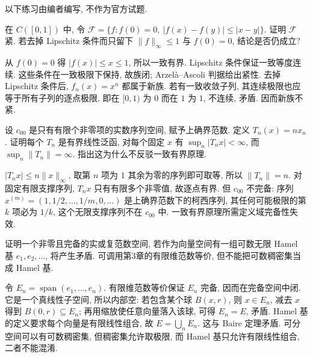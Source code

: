以下练习由编者编写, 不作为官方试题.
\begin{exercise}
在 $C([0,1])$ 中, 令 $\mathcal F=\{f:f(0)=0,\ |f(x)-f(y)|\le|x-y|\}$. 证明 $\mathcal F$ 紧. 若去掉 Lipschitz 条件而只留下 $\lVert f\rVert_\infty\le1$ 与 $f(0)=0$, 结论是否仍成立?
\end{exercise}
\begin{solution}
从 $f(0)=0$ 得 $|f(x)|\le x\le1$, 所以一致有界. Lipschitz 条件保证一致等度连续. 这些条件在一致极限下保持, 故族闭; Arzel\`a--Ascoli 判据给出紧性. 去掉 Lipschitz 条件后, $f_n(x)=x^n$ 都属于新族. 若有一致收敛子列, 其连续极限也应等于所有子列的逐点极限, 即在 $[0,1)$ 为 $0$ 而在 $1$ 为 $1$, 不连续, 矛盾. 因而新族不紧.
\end{solution}
\begin{exercise}
设 $c_{00}$ 是只有有限个非零项的实数序列空间, 赋予上确界范数. 定义 $T_n(x)=nx_n$. 证明每个 $T_n$ 是有界线性泛函, 对每个固定 $x$ 有 $\sup_n|T_nx|<\infty$, 而 $\sup_n\lVert T_n\rVert=\infty$. 指出这为什么不反驳一致有界原理.
\end{exercise}
\begin{solution}
$|T_nx|\le n\lVert x\rVert_\infty$, 取第 $n$ 项为 $1$ 其余为零的序列即可取等, 所以 $\lVert T_n\rVert=n$. 对固定有限支撑序列, $T_nx$ 只有有限多个非零值, 故逐点有界. 但 $c_{00}$ 不完备: 序列 $x^{(m)}=(1,1/2,\ldots,1/m,0,\ldots)$ 是上确界范数下的柯西序列, 其任何可能极限的第 $k$ 项必为 $1/k$, 这个无限支撑序列不在 $c_{00}$ 中. 一致有界原理所需定义域完备性失效.
\end{solution}
\begin{exercise}
证明一个非零且完备的实或复范数空间, 若作为向量空间有一组可数无限 Hamel 基 $e_1,e_2,\ldots$, 将产生矛盾. 可调用第3章的有限维范数等价, 但不能把可数稠密集当成 Hamel 基.
\end{exercise}
\begin{solution}
令 $E_n=\operatorname{span}(e_1,\ldots,e_n)$. 有限维范数等价保证 $E_n$ 完备, 因而在完备空间中闭. 它是一个真线性子空间, 所以内部空: 若包含某个球 $B(x,r)$, 则 $x\in E_n$, 减去 $x$ 得到 $B(0,r)\subseteq E_n$; 再用缩放使任意向量落入该球, 可得 $E_n=E$, 矛盾. Hamel 基的定义要求每个向量是有限线性组合, 故 $E=\bigcup_n E_n$. 这与 Baire 定理矛盾. 可分空间可以有可数稠密集, 但稠密集允许取极限, 而 Hamel 基只允许有限线性组合, 二者不能混淆.
\end{solution}
